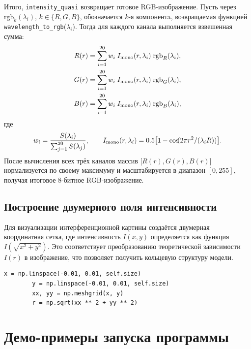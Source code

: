 \documentclass[a4paper,11pt]{article}
\theoremstyle{definition}
\begin{document}
\begin{itemize}
    Итого, \texttt{intensity\_quasi} возвращает готовое RGB-изображение. Пусть через
        \(\mathrm{rgb}_k(\lambda_i)\), \(k\in\{R,G,B\}\), обозначается \(k\)-я компонентa,
        возвращаемая функцией \texttt{wavelength\_to\_rgb}(\(\lambda_i\)).
        Тогда для каждого канала выполняется взвешенная сумма:
        \[
        \begin{aligned}
        R(r) &= \sum_{i=1}^{20} w_i \; I_{\rm mono}(r,\lambda_i)\;\mathrm{rgb}_R(\lambda_i),\\
        G(r) &= \sum_{i=1}^{20} w_i \; I_{\rm mono}(r,\lambda_i)\;\mathrm{rgb}_G(\lambda_i),\\
        B(r) &= \sum_{i=1}^{20} w_i \; I_{\rm mono}(r,\lambda_i)\;\mathrm{rgb}_B(\lambda_i),
        \end{aligned}
        \]
        где
        \[
        w_i = \frac{S(\lambda_i)}{\sum_{j=1}^{20}S(\lambda_j)},
        \qquad
        I_{\rm mono}(r,\lambda_i) = 0.5\bigl[1 - \cos\!(2\pi r^2/(\lambda_i R))\bigr].
        \]
        После вычисления всех трёх каналов массив \(\bigl[R(r),G(r),B(r)\bigr]\) нормализуется
        по своему максимуму и масштабируется в диапазон \([0,255]\), получая итоговое 8-битное RGB-изображение.

        \end{itemize}


    \subsection{Построение двумерного поля интенсивности}
    Для визуализации интерференционной картины создаётся двумерная координатная сетка, где интенсивность \( I(x,y) \)
    определяется как функция \( I\left(\sqrt{x^2+y^2}\right) \). Это соответствует преобразованию теоретической
    зависимости \( I(r) \) в изображение, что позволяет получить кольцевую структуру модели.

    \begin{lstlisting}[language=MyPython,label={lst:lstlisting3}]
        x = np.linspace(-0.01, 0.01, self.size)
        y = np.linspace(-0.01, 0.01, self.size)
        xx, yy = np.meshgrid(x, y)
        r = np.sqrt(xx ** 2 + yy ** 2)
    \end{lstlisting}


    \section{Демо-примеры запуска программы}
\end{document}
